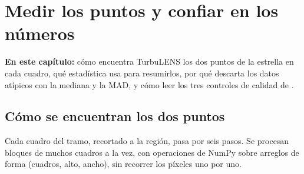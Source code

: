 \chapter{Medir los puntos y confiar en los números}\label{cap:estadistica}

\begin{resumen}
\textbf{En este capítulo:} cómo encuentra TurbuLENS los dos puntos de la estrella en cada cuadro, qué estadística usa
para resumirlos, por qué descarta los datos atípicos con la mediana y la MAD, y cómo leer los tres controles de calidad
de .
\end{resumen}

\section{Cómo se encuentran los dos puntos}\label{sec:deteccion}

Cada cuadro del tramo, recortado a la región, pasa por seis pasos. Se procesan bloques de muchos cuadros a la vez, con
operaciones de NumPy sobre arreglos de forma (cuadros, alto, ancho), sin recorrer los píxeles uno por uno.

